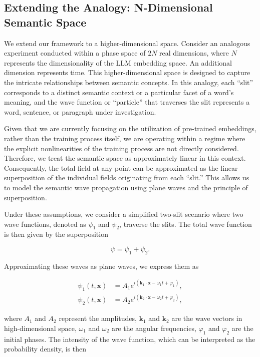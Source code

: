 \documentclass[prd,amsmath,amssymb,12pt]{revtex4}
\begin{document}
\subsection{Extending the Analogy: N-Dimensional Semantic Space}

We extend our framework to a higher-dimensional space. Consider an analogous experiment conducted within
a phase space of $2N$ real dimensions, where $N$ represents the dimensionality of the LLM embedding space. An additional
dimension represents time. This higher-dimensional space is designed to capture the intricate relationships between
semantic concepts. In this analogy, each ``slit'' corresponds to a distinct semantic context or a particular facet
of a word's meaning, and the wave function or ``particle'' that traverses the slit represents a word, sentence, or
paragraph under investigation.

Given that we are currently focusing on the utilization of pre-trained embeddings, rather than the training process
itself, we are operating within a regime where the explicit nonlinearities of the training process are not directly
considered. Therefore, we treat the semantic space as approximately linear in this context. Consequently, the total
field at any point can be approximated as the linear superposition of the individual fields originating from each
``slit.'' This allows us to model the semantic wave propagation using plane waves and the principle of superposition.

Under these assumptions, we consider a simplified two-slit scenario where two wave functions, denoted as $\psi_1$
and $\psi_2$, traverse the slits. The total wave function is then given by the superposition

\begin{equation}
    \psi = \psi_1 + \psi_2.
\end{equation}

\noindent
Approximating these waves as plane waves, we express them as

\begin{align}
    \psi_1(t, \mathbf{x}) &= A_1 e^{i(\mathbf{k}_1 \cdot \mathbf{x} - \omega_1 t + \varphi_1 )}, \\
    \psi_2(t, \mathbf{x}) &= A_2 e^{i(\mathbf{k}_2 \cdot \mathbf{x} - \omega_2 t + \varphi_2 )},
\end{align}

\noindent
where $A_1$ and $A_2$ represent the amplitudes, $\mathbf{k}_1$ and $\mathbf{k}_2$ are the wave vectors
in high-dimensional space,
$\omega_1$ and $\omega_2$ are the angular frequencies, $\varphi_1$ and $\varphi_2$ are the initial phases.
The intensity of the wave function, which can be interpreted as the probability density, is then
\end{document}
